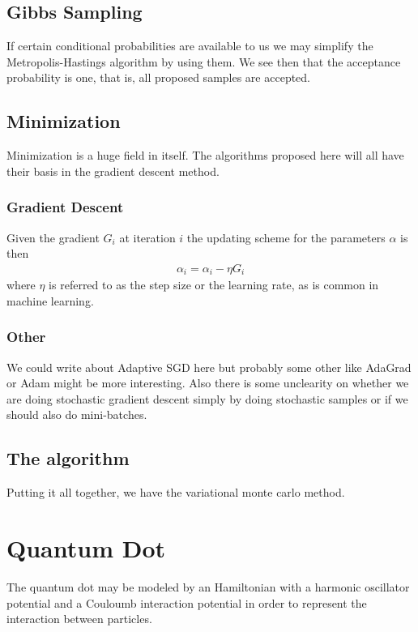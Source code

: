 \documentclass[twoside,english]{uiofysmaster}
\begin{document}
\cite{Umrigar1999}

\subsection{Gibbs Sampling}
If certain conditional probabilities are available to us we may simplify the Metropolis-Hastings algorithm by using them. We see then that the acceptance probability is one, that is, all proposed samples are accepted.

\subsection{Minimization}
Minimization is a huge field in itself. The algorithms proposed here will all have their basis in the gradient descent method. 

\subsubsection{Gradient Descent}
Given the gradient $G_i$ at iteration $i$ the updating scheme for the parameters $\alpha$ is then
\begin{align}
	\alpha_i = \alpha_i - \eta G_i
\end{align}
where $\eta$ is referred to as the step size or the learning rate, as is common in machine learning.

\subsubsection{Other}
We could write about Adaptive SGD here but probably some other like AdaGrad or Adam might be more interesting. Also there is some unclearity on whether we are doing stochastic gradient descent simply by doing stochastic samples or if we should also do mini-batches.

\subsection{The algorithm}
Putting it all together, we have the variational monte carlo method. 

\section{Quantum Dot}
The quantum dot may be modeled by an Hamiltonian with a harmonic oscillator potential and a Couloumb interaction potential in order to represent the interaction between particles.
\end{document}
